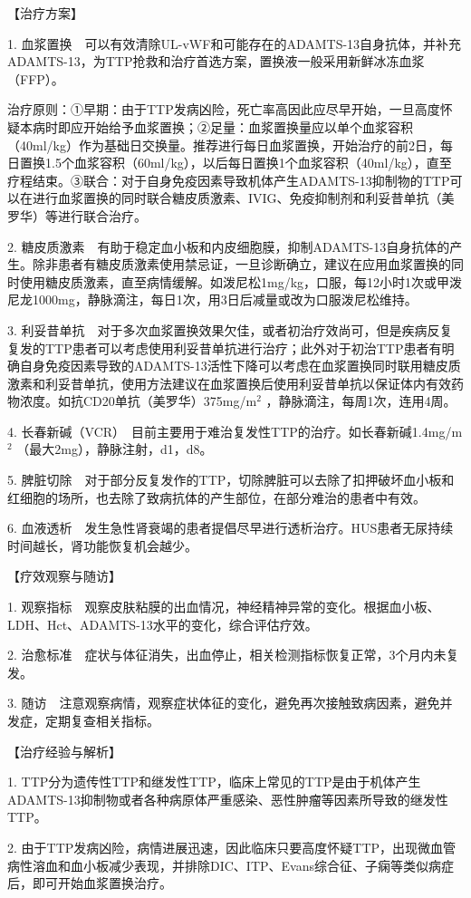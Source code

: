 【治疗方案】

1.
血浆置换　可以有效清除UL-vWF和可能存在的ADAMTS-13自身抗体，并补充ADAMTS-13，为TTP抢救和治疗首选方案，置换液一般采用新鲜冰冻血浆（FFP）。

治疗原则：①早期：由于TTP发病凶险，死亡率高因此应尽早开始，一旦高度怀疑本病时即应开始给予血浆置换；②足量：血浆置换量应以单个血浆容积（40ml/kg）作为基础日交换量。推荐进行每日血浆置换，开始治疗的前2日，每日置换1.5个血浆容积（60ml/kg），以后每日置换1个血浆容积（40ml/kg），直至疗程结束。③联合：对于自身免疫因素导致机体产生ADAMTS-13抑制物的TTP可以在进行血浆置换的同时联合糖皮质激素、IVIG、免疫抑制剂和利妥昔单抗（美罗华）等进行联合治疗。

2.
糖皮质激素　有助于稳定血小板和内皮细胞膜，抑制ADAMTS-13自身抗体的产生。除非患者有糖皮质激素使用禁忌证，一旦诊断确立，建议在应用血浆置换的同时使用糖皮质激素，直至病情缓解。如泼尼松1mg/kg，口服，每12小时1次或甲泼尼龙1000mg，静脉滴注，每日1次，用3日后减量或改为口服泼尼松维持。

3.
利妥昔单抗　对于多次血浆置换效果欠佳，或者初治疗效尚可，但是疾病反复复发的TTP患者可以考虑使用利妥昔单抗进行治疗；此外对于初治TTP患者有明确自身免疫因素导致的ADAMTS-13活性下降可以考虑在血浆置换同时联用糖皮质激素和利妥昔单抗，使用方法建议在血浆置换后使用利妥昔单抗以保证体内有效药物浓度。如抗CD20单抗（美罗华）375mg/m$^2$
，静脉滴注，每周1次，连用4周。

4.
长春新碱（VCR）　目前主要用于难治复发性TTP的治疗。如长春新碱1.4mg/m$^2$
（最大2mg），静脉注射，d1，d8。

5.
脾脏切除　对于部分反复发作的TTP，切除脾脏可以去除了扣押破坏血小板和红细胞的场所，也去除了致病抗体的产生部位，在部分难治的患者中有效。

6.
血液透析　发生急性肾衰竭的患者提倡尽早进行透析治疗。HUS患者无尿持续时间越长，肾功能恢复机会越少。

【疗效观察与随访】

1.
观察指标　观察皮肤粘膜的出血情况，神经精神异常的变化。根据血小板、LDH、Hct、ADAMTS-13水平的变化，综合评估疗效。

2.
治愈标准　症状与体征消失，出血停止，相关检测指标恢复正常，3个月内未复发。

3.
随访　注意观察病情，观察症状体征的变化，避免再次接触致病因素，避免并发症，定期复查相关指标。

【治疗经验与解析】

1.
TTP分为遗传性TTP和继发性TTP，临床上常见的TTP是由于机体产生ADAMTS-13抑制物或者各种病原体严重感染、恶性肿瘤等因素所导致的继发性TTP。

2.
由于TTP发病凶险，病情进展迅速，因此临床只要高度怀疑TTP，出现微血管病性溶血和血小板减少表现，并排除DIC、ITP、Evans综合征、子痫等类似病症后，即可开始血浆置换治疗。

